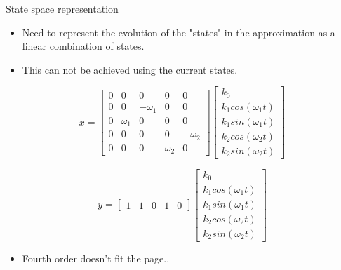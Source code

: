 
\begin{frame}{State space representation}
	\begin{itemize}
		\item Need to represent the evolution of the "states" in the approximation as a linear combination of states.
		\item This can not be achieved using the current states.   
	\end{itemize}
	
\begin{equation} \label{eq:consump_A}
	\dot{x} = 
	\begin{bmatrix}
		0 & 0 & 0 & 0 & 0 \\
		0 & 0 & -\omega_1 & 0 & 0 \\
		0 & \omega_1 & 0 & 0 & 0 \\
		0 & 0 & 0 & 0 & -\omega_2 \\
		0 & 0 & 0 & \omega_2 & 0 
	\end{bmatrix}
	\begin{bmatrix}
		k_0 \\
		k_1 cos(\omega_1 t) \\
		k_1 sin(\omega_1 t) \\
		k_2 cos(\omega_2 t) \\
		k_2 sin(\omega_2 t) 
	\end{bmatrix}
\end{equation}

\begin{equation}
	y = \begin{bmatrix} 1 & 1 & 0 & 1 & 0 \end{bmatrix} 
	\begin{bmatrix}
		k_0 \\
		k_1 cos(\omega_1 t) \\
		k_1 sin(\omega_1 t) \\
		k_2 cos(\omega_2 t) \\
		k_2 sin(\omega_2 t) 
	\end{bmatrix}
\end{equation}

	\begin{itemize}
	\item Fourth order doesn't fit the page..
\end{itemize}
\end{frame}


